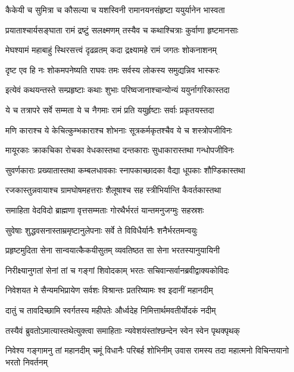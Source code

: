 \twolineshloka
{कैकेयी च सुमित्रा च कौसल्या च यशस्विनी}
{रामानयनसंहृष्टा ययुर्यानेन भास्वता} %

\twolineshloka
{प्रयाताश्चार्यसङ्घाता रामं द्रष्टुं सलक्ष्मणम्}
{तस्यैव च कथाश्चित्राः कुर्वाणा हृष्टमानसाः} %

\twolineshloka
{मेघश्यामं महाबाहुं स्थिरसत्त्वं दृढव्रतम्}
{कदा द्रक्ष्यामहे रामं जगतः शोकनाशनम्} %

\twolineshloka
{दृष्ट एव हि नः शोकमपनेष्यति राघवः}
{तमः सर्वस्य लोकस्य समुद्यन्निव भास्करः} %

\twolineshloka
{इत्येवं कथयन्तस्ते सम्प्रहृष्टाः कथाः शुभाः}
{परिष्वजानाश्चान्योन्यं ययुर्नागरिकास्तदा} %

\twolineshloka
{ये च तत्रापरे सर्वे सम्मता ये च नैगमाः}
{रामं प्रति ययुर्हृष्टाः सर्वाः प्रकृतयस्तदा} %

\twolineshloka
{मणि काराश्च ये केचित्कुम्भकाराश्च शोभनाः}
{सूत्रकर्मकृतश्चैव ये च शस्त्रोपजीविनः} %

\twolineshloka
{मायूरकाः क्राकचिका रोचका वेधकास्तथा}
{दन्तकाराः सुधाकारास्तथा गन्धोपजीविनः} %

\twolineshloka
{सुवर्णकाराः प्रख्यातास्तथा कम्बलधावकाः}
{स्नापकाच्छादका वैद्या धूपकाः शौण्डिकास्तथा} %

\twolineshloka
{रजकास्तुन्नवायाश्च ग्रामघोषमहत्तराः}
{शैलूषाश्च सह स्त्रीभिर्यान्ति कैवर्तकास्तथा} %

\twolineshloka
{समाहिता वेदविदो ब्राह्मणा वृत्तसम्मताः}
{गोरथैर्भरतं यान्तमनुजग्मुः सहस्रशः} %

\twolineshloka
{सुवेषाः शुद्धवसनास्ताम्रमृष्टानुलेपनाः}
{सर्वे ते विविधैर्यानैः शनैर्भरतमन्वयुः} %

\twolineshloka
{प्रहृष्टमुदिता सेना सान्वयात्कैकयीसुतम्}
{व्यवतिष्ठत सा सेना भरतस्यानुयायिनी} %

\twolineshloka
{निरीक्ष्यानुगतां सेनां तां च गङ्गां शिवोदकाम्}
{भरतः सचिवान्सर्वानब्रवीद्वाक्यकोविदः} %

\twolineshloka
{निवेशयत मे सैन्यमभिप्रायेण सर्वशः}
{विश्रान्तः प्रतरिष्यामः श्व इदानीं महानदीम्} %

\twolineshloka
{दातुं च तावदिच्छामि स्वर्गतस्य महीपतेः}
{और्ध्वदेह निमित्तार्थमवतीर्योदकं नदीम्} %

\twolineshloka
{तस्यैवं ब्रुवतोऽमात्यास्तथेत्युक्त्वा समाहिताः}
{न्यवेशयंस्तांश्छन्देन स्वेन स्वेन पृथक्पृथक्} %

\fourlineindentedshloka
{निवेश्य गङ्गामनु तां महानदीम्}
{चमूं विधानैः परिबर्ह शोभिनीम्}
{उवास रामस्य तदा महात्मनो}
{विचिन्तयानो भरतो निवर्तनम्} %


